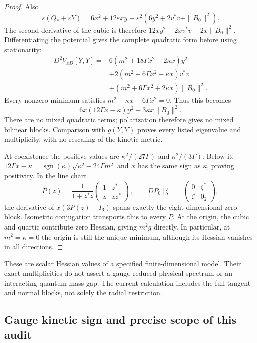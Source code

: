 \begin{proof}
Also
\[
 s(Q_*+\varepsilon Y)=6x^2+12\varepsilon xy
            +\varepsilon^2(6y^2+2v^*v+\|B_0\|^2).
\]
The second derivative of the cubic is therefore
$12xy^2+2xv^*v-2x\|B_0\|^2$. Differentiating the potential gives the
complete quadratic form before using stationarity:
\begin{align*}
 D^2V_{xD}[Y,Y]
 ={}&6(m^2+18\Gamma x^2-2\kappa x)y^2\\
 &+2(m^2+6\Gamma x^2-\kappa x)v^*v\\
 &+(m^2+6\Gamma x^2+2\kappa x)\|B_0\|^2.
\end{align*}
Every nonzero minimum satisfies $m^2-\kappa x+6\Gamma x^2=0$.
Thus this becomes
\[
 6x(12\Gamma x-\kappa)y^2+3\kappa x\|B_0\|^2.
\]
There are no mixed quadratic terms; polarization therefore gives no mixed
bilinear blocks. Comparison with $g(Y,Y)$ proves every listed eigenvalue
and multiplicity, with no rescaling of the kinetic metric.

At coexistence the positive values are
$\kappa^2/(27\Gamma)$ and $\kappa^2/(3\Gamma)$.
Below it, $12\Gamma x-\kappa=
\operatorname{sgn}(\kappa)\sqrt{\kappa^2-24\Gamma m^2}$ and $x$ has
the same sign as $\kappa$, proving positivity. In the line chart
\[
 P(z)=\frac1{1+z^*z}\begin{pmatrix}1&z^*\\z&zz^*\end{pmatrix},
 \qquad DP_0[\zeta]=\begin{pmatrix}0&\zeta^*\\\zeta&0_2\end{pmatrix},
\]
the derivative of $x(3P(z)-I_3)$ spans exactly the eight-dimensional
zero block. Isometric conjugation transports this to every $P$.
At the origin, the cubic and quartic contribute zero Hessian, giving
$m^2g$ directly. In particular, at $m^2=\kappa=0$ the origin is still the
unique minimum, although its Hessian vanishes in all directions.
\end{proof}

These are scalar Hessian values of a specified finite-dimensional model.
Their exact multiplicities do not assert a gauge-reduced physical spectrum
or an interacting quantum mass gap. The current calculation includes the
full tangent and normal blocks, not solely the radial restriction.

\subsection{Gauge kinetic sign and precise scope of this audit}

